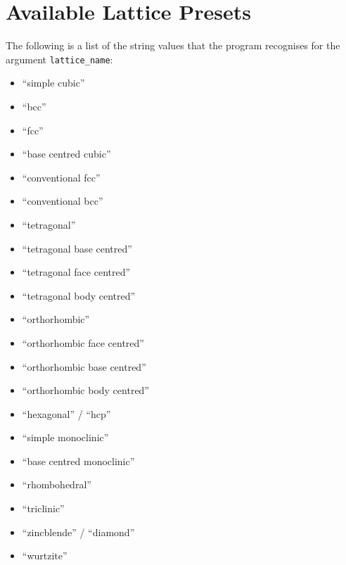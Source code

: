 \documentclass[a4paper,11pt]{article}
\numberwithin{equation}{section}
\begin{document}
\section{Available Lattice Presets}
The following is a list of the string values that the program recognises for the argument \texttt{lattice\_name}:
\begin{itemize}
	\item ``simple cubic''
	\item ``bcc''
	\item ``fcc''
	\item ``base centred cubic''
	\item ``conventional fcc''
	\item ``conventional bcc''
	\item ``tetragonal''
	\item ``tetragonal base centred''
	\item ``tetragonal face centred''
	\item ``tetragonal body centred''
	\item ``orthorhombic''
	\item ``orthorhombic face centred''
	\item ``orthorhombic base centred''
	\item ``orthorhombic body centred''
	\item ``hexagonal'' / ``hcp''
	\item ``simple monoclinic''
	\item ``base centred monoclinic''
	\item ``rhombohedral''
	\item ``triclinic''
	\item ``zincblende'' / ``diamond''
	\item ``wurtzite''
\end{itemize}
\end{document}
